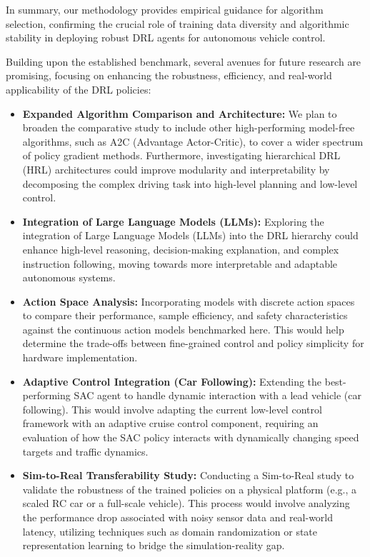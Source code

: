 \documentclass[]{interact}
\begin{document}
In summary, our methodology provides empirical guidance for algorithm selection, confirming the crucial role of training data diversity and algorithmic stability in deploying robust DRL agents for autonomous vehicle control.

Building upon the established benchmark, several avenues for future research are promising, focusing on enhancing the robustness, efficiency, and real-world applicability of the DRL policies:

\begin{itemize}
    \item \textbf{Expanded Algorithm Comparison and Architecture:} We plan to broaden the comparative study to include other high-performing model-free algorithms, such as A2C (Advantage Actor-Critic), to cover a wider spectrum of policy gradient methods. Furthermore, investigating hierarchical DRL (HRL) architectures could improve modularity and interpretability by decomposing the complex driving task into high-level planning and low-level control.
    \item \textbf{Integration of Large Language Models (LLMs):} Exploring the integration of Large Language Models (LLMs) into the DRL hierarchy could enhance high-level reasoning, decision-making explanation, and complex instruction following, moving towards more interpretable and adaptable autonomous systems.
    \item \textbf{Action Space Analysis:} Incorporating models with discrete action spaces to compare their performance, sample efficiency, and safety characteristics against the continuous action models benchmarked here. This would help determine the trade-offs between fine-grained control and policy simplicity for hardware implementation.
    \item \textbf{Adaptive Control Integration (Car Following):} Extending the best-performing SAC agent to handle dynamic interaction with a lead vehicle (car following). This would involve adapting the current low-level control framework with an adaptive cruise control component, requiring an evaluation of how the SAC policy interacts with dynamically changing speed targets and traffic dynamics.
    \item \textbf{Sim-to-Real Transferability Study:} Conducting a Sim-to-Real study to validate the robustness of the trained policies on a physical platform (e.g., a scaled RC car or a full-scale vehicle). This process would involve analyzing the performance drop associated with noisy sensor data and real-world latency, utilizing techniques such as domain randomization or state representation learning to bridge the simulation-reality gap.
\end{itemize}
\end{document}
